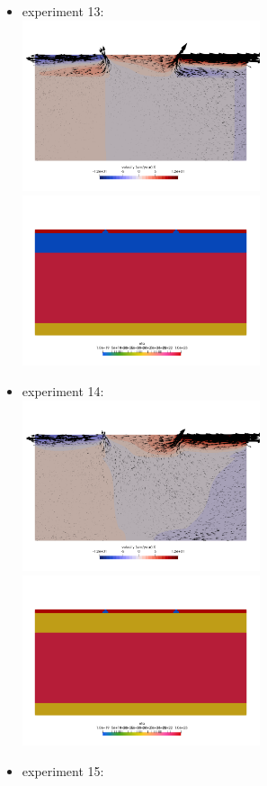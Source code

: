 \newpage
\begin{itemize}
\item experiment 13:\\
\includegraphics[width=7cm]{python_codes/fieldstone_148/results/vels_0012}
\includegraphics[width=7cm]{python_codes/fieldstone_148/results/etas_0012}
\item experiment 14:\\
\includegraphics[width=7cm]{python_codes/fieldstone_148/results/vels_0013}
\includegraphics[width=7cm]{python_codes/fieldstone_148/results/etas_0013}
\item experiment 15:\\

\end{itemize}
